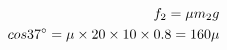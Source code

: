 \documentclass[preview]{standalone}
\begin{document}
\begin{align*}
\special{dvisvgm:raw <g id='unique000'>}f_2 = \mu m_2 g \\cos 37^{\circ} = \mu \times 20 \times 10 \times 0.8 = 160\mu\special{dvisvgm:raw </g>}
\end{align*}
\end{document}
